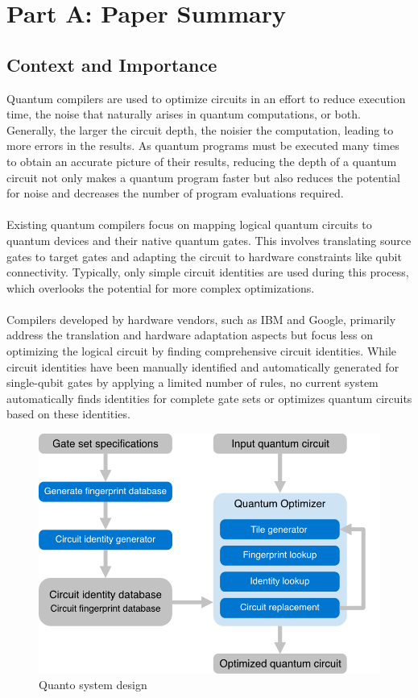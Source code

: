 \section{Part A: Paper Summary}

\subsection{Context and Importance}

Quantum compilers are used to optimize circuits in an effort to reduce execution time, the noise that naturally arises in quantum computations, or both. Generally, the larger the circuit depth, the noisier the computation, leading to more errors in the results. As quantum programs must be executed many times to obtain an accurate picture of their results, reducing the depth of a quantum circuit not only makes a quantum program faster but also reduces the potential for noise and decreases the number of program evaluations required.
\\\\
Existing quantum compilers focus on mapping logical quantum circuits to quantum devices and their native quantum gates. This involves translating source gates to target gates and adapting the circuit to hardware constraints like qubit connectivity. Typically, only simple circuit identities are used during this process, which overlooks the potential for more complex optimizations.
\\\\
Compilers developed by hardware vendors, such as IBM and Google, primarily address the translation and hardware adaptation aspects but focus less on optimizing the logical circuit by finding comprehensive circuit identities. While circuit identities have been manually identified and automatically generated for single-qubit gates by applying a limited number of rules, no current system automatically finds identities for complete gate sets or optimizes quantum circuits based on these identities.

\begin{figure}
  \includegraphics[width=0.7\columnwidth]{assets/quanto_system.png}
  \caption{Quanto system design}
  \label{fig:quanto_system}
\end{figure}
